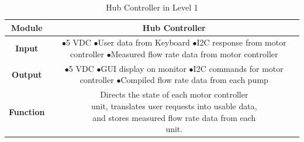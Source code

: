 \documentclass[journal]{IEEEtran}
\begin{document}
            
            \begin{table}[H]
            \renewcommand{\arraystretch}{1.3}
            \caption{Hub Controller in Level 1}
            \label{table:Hub_1}
                \begin{center}
                    \begin{tabular}{|c|c|}
                        \hline
                        \bfseries Module & Hub Controller \\ \hline
                        \bfseries Input & 
                            \makecell[l]{\(\bullet\)5 VDC\\
                                         \(\bullet\)User data from Keyboard\\
                                         \(\bullet\)I2C response from motor controller\\
                                         \(\bullet\)Measured flow rate data from motor controller\\ }\\ \hline
                        \bfseries Output &
                            \makecell[l]{\(\bullet\)5 VDC\\
                                         \(\bullet\)GUI display on monitor\\
                                         \(\bullet\)I2C commands for motor controller\\
                                         \(\bullet\)Compiled flow rate data from each pump \\}\\ \hline
                        \bfseries Function & 
                            \makecell[l]{Directs the state of each motor controller \\unit,              translates user requests into usable data, \\
                                         and stores measured flow rate data from each\\
                                         unit.}\\ \hline
                    \end{tabular}
                \end{center}
            \end{table}
            
\end{document}
